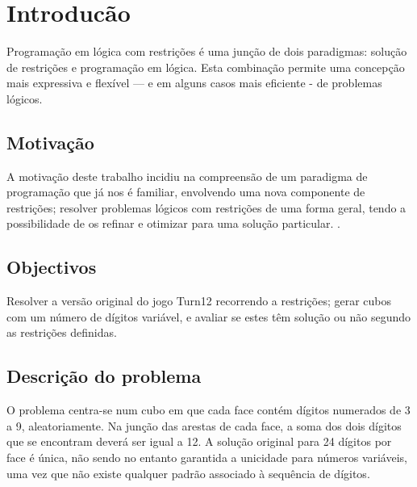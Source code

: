 %
%

\chapter{Introducão}
\label{introduction} %

Programação em lógica com restrições é uma junção de dois paradigmas: solução de restrições e programação em lógica. Esta combinação permite uma concepção mais expressiva e flexível — e em alguns casos mais eficiente - de problemas lógicos.

\section{Motivação}
\label{sec:1}
A motivação deste trabalho incidiu na compreensão de um paradigma de programação que já nos é familiar, envolvendo uma nova componente de restrições; resolver problemas lógicos com restrições de uma forma geral, tendo a possibilidade de os refinar e otimizar para uma solução particular.
\cite{monograph}.

\section{Objectivos}
\label{sec:2}
Resolver a versão original do jogo Turn12 recorrendo a restrições; gerar cubos com um número de dígitos variável, e avaliar se estes têm solução ou não segundo as restrições definidas.

\section{Descrição do problema}
\label{sec:3}
O problema centra-se num cubo em que cada face contém dígitos numerados de 3 a 9, aleatoriamente. Na junção das arestas de cada face, a soma dos dois dígitos que se encontram deverá ser igual a 12.
A solução original para 24 dígitos por face é única, não sendo no entanto garantida a unicidade para números variáveis, uma vez que não existe qualquer padrão associado à sequência de dígitos.

%
